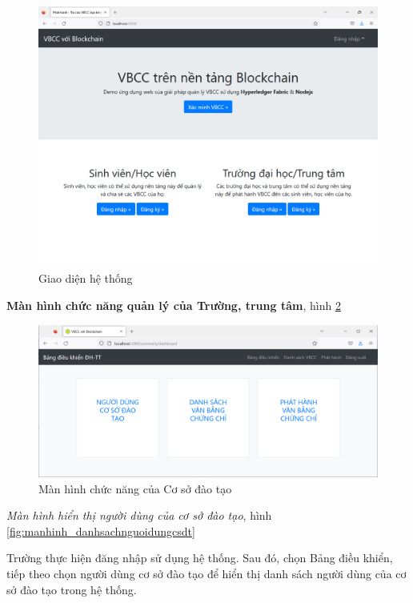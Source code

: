 \begin{figure}[H]
\centering
\includegraphics[width=.9\linewidth]{img/main_vbcc.png}
\caption{Giao diện hệ thống}
\label{fig:main_vbcc}
\end{figure}

\textbf{Màn hình chức năng quản lý của Trường, trung tâm}, hình \ref{fig:manhinh_bangdieukhien}

\begin{figure}[H]
\centering
\includegraphics[width=.9\linewidth]{img/manhinh_bangdieukhien.png}
\caption{Màn hình chức năng của Cơ sở đào tạo}
\label{fig:manhinh_bangdieukhien}
\end{figure}

\emph{Màn hình hiển thị người dùng của cơ sở đào tạo}, hình \ref{fig:manhinh_danhsachnguoidungcsdt}

Trường thực hiện đăng nhập sử dụng hệ thống. Sau đó, chọn Bảng điều khiển, tiếp theo chọn người dùng cơ sở đào tạo để hiển thị danh sách người dùng của cơ sở đào tạo trong hệ thống.

